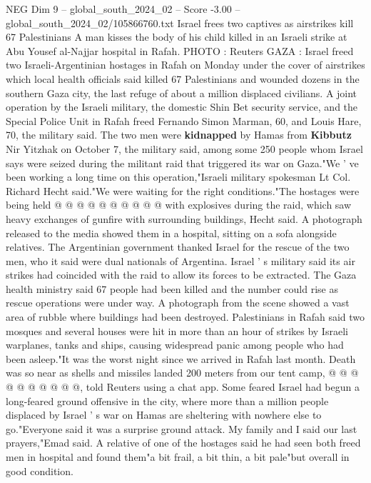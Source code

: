 \begin{textsample}{NEG Dim 9 – global\_south\_2024\_02 – Score -3.00 – global\_south\_2024\_02/105866760.txt}  \label{ex:f9_neg_350}
Israel frees two captives as airstrikes kill 67 Palestinians A man kisses the body of his child killed in an Israeli strike at Abu Yousef al-Najjar hospital in Rafah.
PHOTO : Reuters GAZA : Israel freed two Israeli-Argentinian hostages in Rafah on Monday under the cover of airstrikes which local health officials said killed 67 Palestinians and wounded dozens in the southern Gaza city, the last refuge of about a million displaced civilians.
A joint operation by the Israeli military, the domestic Shin Bet security service, and the Special Police Unit in Rafah freed Fernando Simon Marman, 60, and Louis Hare, 70, the military said.
The two men were \textbf{kidnapped} by Hamas from \textbf{Kibbutz} Nir Yitzhak on October 7, the military said, among some 250 people whom Israel says were seized during the militant raid that triggered its war on Gaza."We ' ve been working a long time on this operation,"Israeli military spokesman Lt Col.
Richard Hecht said."We were waiting for the right conditions."The hostages were being held @ @ @ @ @ @ @ @ @ @ with explosives during the raid, which saw heavy exchanges of gunfire with surrounding buildings, Hecht said.
A photograph released to the media showed them in a hospital, sitting on a sofa alongside relatives.
The Argentinian government thanked Israel for the rescue of the two men, who it said were dual nationals of Argentina.
Israel ' s military said its air strikes had coincided with the raid to allow its forces to be extracted.
The Gaza health ministry said 67 people had been killed and the number could rise as rescue operations were under way.
A photograph from the scene showed a vast area of rubble where buildings had been destroyed.
Palestinians in Rafah said two mosques and several houses were hit in more than an hour of strikes by Israeli warplanes, tanks and ships, causing widespread panic among people who had been asleep."It was the worst night since we arrived in Rafah last month.
Death was so near as shells and missiles landed 200 meters from our tent camp, @ @ @ @ @ @ @ @ @ @, told Reuters using a chat app.
Some feared Israel had begun a long-feared ground offensive in the city, where more than a million people displaced by Israel ' s war on Hamas are sheltering with nowhere else to go."Everyone said it was a surprise ground attack.
My family and I said our last prayers,"Emad said.
A relative of one of the hostages said he had seen both freed men in hospital and found them"a bit frail, a bit thin, a bit pale"but overall in good condition.

\end{textsample}
